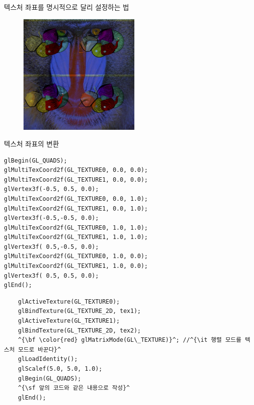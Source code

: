 \documentclass{beamer}
\begin{document}
\begin{frame}[fragile]{텍스처 좌표를 명시적으로 달리 설정하는 법}

\begin{figure}[h!]
  \centering
	\includegraphics[height=6cm]{OGL_texture/multiTex2.png} 
\end{figure}

\end{frame}


\begin{frame}[fragile]{텍스처 좌표의 변환}

\lstset{language=C++} 
\begin{lstlisting}
glBegin(GL_QUADS);
glMultiTexCoord2f(GL_TEXTURE0, 0.0, 0.0);
glMultiTexCoord2f(GL_TEXTURE1, 0.0, 0.0);
glVertex3f(-0.5, 0.5, 0.0);
glMultiTexCoord2f(GL_TEXTURE0, 0.0, 1.0);
glMultiTexCoord2f(GL_TEXTURE1, 0.0, 1.0);
glVertex3f(-0.5,-0.5, 0.0);
glMultiTexCoord2f(GL_TEXTURE0, 1.0, 1.0);
glMultiTexCoord2f(GL_TEXTURE1, 1.0, 1.0);
glVertex3f( 0.5,-0.5, 0.0);
glMultiTexCoord2f(GL_TEXTURE0, 1.0, 0.0);
glMultiTexCoord2f(GL_TEXTURE1, 1.0, 0.0);
glVertex3f( 0.5, 0.5, 0.0);
glEnd();
\end{lstlisting}

\lstset{language=C++, escapechar=^} 
\begin{lstlisting}
    glActiveTexture(GL_TEXTURE0);
    glBindTexture(GL_TEXTURE_2D, tex1);
    glActiveTexture(GL_TEXTURE1);
    glBindTexture(GL_TEXTURE_2D, tex2);
    ^{\bf \color{red} glMatrixMode(GL\_TEXTURE)}^; //^{\it 행렬 모드를 텍스처 모드로 바꾼다}^
    glLoadIdentity();
    glScalef(5.0, 5.0, 1.0);    
    glBegin(GL_QUADS);
    ^{\sf 앞의 코드와 같은 내용으로 작성}^
    glEnd();
\end{lstlisting}

\end{frame}
\end{document}
